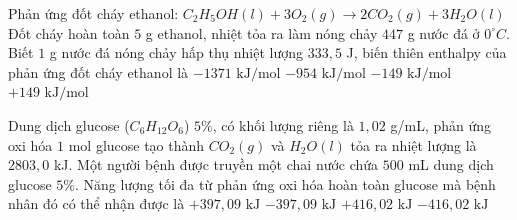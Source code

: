 \documentclass[Main.tex]{subfiles}
\begin{document}
	\begin{ex}
		 Phản ứng đốt cháy ethanol:
		$C_2H_5OH (l) + 3O_2 (g) \longrightarrow 2CO_2 (g) + 3H_2O (l)$
		Đốt cháy hoàn toàn $5$ g ethanol, nhiệt tỏa ra làm nóng chảy $447$ g nước đá ở $0^\circ C$. Biết $1$ g nước đá nóng chảy hấp thụ nhiệt lượng $333{,}5$ J, biến thiên enthalpy của phản ứng đốt cháy ethanol là
		{\True $-1371 \text{ kJ/mol}$}
		{$-954 \text{ kJ/mol}$}
		{$-149 \text{ kJ/mol}$}
		{$+149 \text{ kJ/mol}$}
	\end{ex}
	\begin{ex}
		 Dung dịch glucose ($C_6H_{12}O_6$) $5\%$, có khối lượng riêng là $1{,}02$ g/mL, phản ứng oxi hóa $1$ mol glucose tạo thành $CO_2 (g)$ và $H_2O (l)$ tỏa ra nhiệt lượng là $2803{,}0$ kJ.
		Một người bệnh được truyền một chai nước chứa $500$ mL dung dịch glucose $5\%$. Năng lượng tối đa từ phản ứng oxi hóa hoàn toàn glucose mà bệnh nhân đó có thể nhận được là
		{\True $+397{,}09 \text{ kJ}$}
		{$-397{,}09 \text{ kJ}$}
		{$+416{,}02 \text{ kJ}$}
		{$-416{,}02 \text{ kJ}$}
	\end{ex}
	
\end{document}
